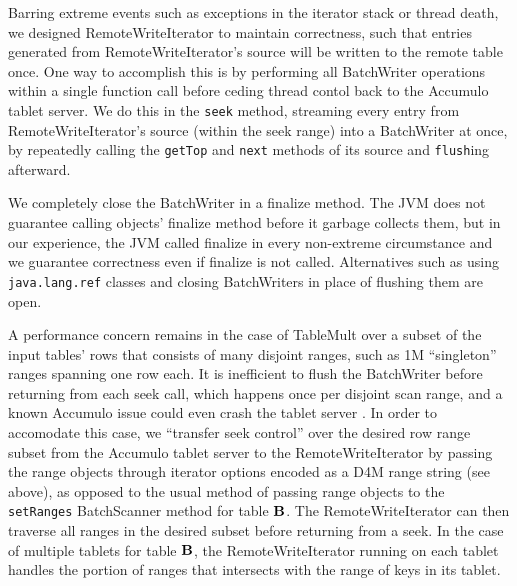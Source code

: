 Barring extreme events such as exceptions in the iterator stack or thread death,
we designed RemoteWriteIterator to maintain correctness, such that entries generated from
RemoteWriteIterator's source will be written to the remote table once.
One way to accomplish this is by performing all BatchWriter operations within a single function call
before ceding thread contol back to the Accumulo tablet server.  We do this in the \texttt{seek} method,
streaming every entry from RemoteWriteIterator's source (within the seek range) into a BatchWriter at once, 
by repeatedly calling the \texttt{getTop} and \texttt{next} methods of its source and \texttt{flush}ing afterward.

We completely close the BatchWriter in a finalize method.
The JVM does not guarantee calling objects' finalize method before it garbage collects them, 
but in our experience, the JVM called finalize in every non-extreme circumstance
and we guarantee correctness even if finalize is not called. Alternatives such as using \texttt{java.lang.ref}
classes and closing BatchWriters in place of flushing them are open.

A performance concern remains in the case of TableMult over a subset of the input tables' rows 
that consists of many disjoint ranges, such as 1M ``singleton'' ranges spanning one row each.
It is inefficient to flush the BatchWriter before returning from each seek call, which happens once per 
disjoint scan range, and a known Accumulo issue could even crash the tablet server \cite{ACCUMULO-3710}.
In order to accomodate this case, we ``transfer seek control'' over the desired row range
subset from the Accumulo tablet server to the RemoteWriteIterator by passing the range objects through 
iterator options encoded as a D4M range string (see above), as opposed to the usual method of 
passing range objects to the \texttt{setRanges} BatchScanner method for table $\mathbf{B}$.
The RemoteWriteIterator can then traverse all ranges in the desired subset before returning from a seek.
In the case of multiple tablets for table $\mathbf{B}$, the RemoteWriteIterator running on each tablet handles 
the portion of ranges that intersects with the range of keys in its tablet.

